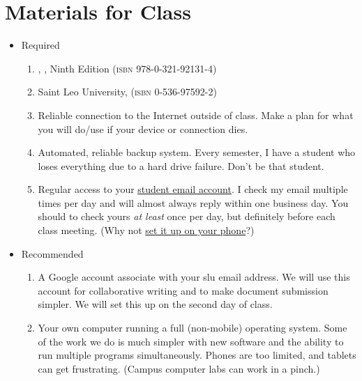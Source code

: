\documentclass[12pt,oneside]{amsart}	%
\begin{document}
\section{Materials for Class}
\begin{itemize}
	\item Required
		\begin{enumerate}
		\item \citeauthor{harris:aa}, , Ninth Edition (\textsc{isbn} 978-0-321-92131-4)
		\item Saint Leo University,  (\textsc{isbn} 0-536-97592-2)
		\item Reliable connection to the Internet outside of class. Make a plan for what you will do/use if your device or connection dies.
		\item Automated, reliable backup system. Every semester, I have a student who loses everything due to a hard drive failure. Don't be that student.
		\item Regular access to your \href{http://outlook.com/saintleo.edu}{student email account}. I check my email multiple times per day and will almost always reply within one business day. You should to check yours \emph{at least} once per day, but definitely before each class meeting. (Why not \href{http://www.saintleo.edu/media/216502/directions_for_setting_up_student_email_access.pdf}{set it up on your phone}?)
	\end{enumerate}
	\item Recommended
	\begin{enumerate}
		\item A Google account associate with your \ac{slu} email address. We will use this account for collaborative writing and to make document submission simpler. We will set this up on the second day of class.
		\item Your own computer running a full (non-mobile) operating system. Some of the work we do is much simpler with new software and the ability to run multiple programs simultaneously. Phones are too limited, and tablets can get frustrating. (Campus computer labs can work in a pinch.)
	\end{enumerate}
\end{itemize}
\end{document}
